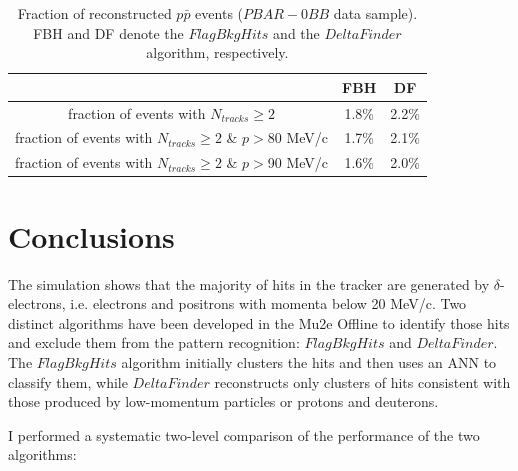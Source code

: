 \begin{center}
        \begin{table}[h!]
        \centering
        \renewcommand{\arraystretch}{1.}
        \begin{tabular}{| c | c | c |} 
            \hline
            &  FBH & DF\\
            \hline
            fraction of events with $N_{tracks} \geq 2$ &  1.8\% & 2.2\%\\
            \hline
            fraction of events with $N_{tracks} \geq 2$ \& $p>$80 MeV/c & 1.7\% & 2.1\%\\
            \hline
            fraction of events with $N_{tracks} \geq 2$ \& $p>$90 MeV/c & 1.6\% & 2.0\%\\
            \hline
            \end{tabular}
        \caption{Fraction of reconstructed $p\bar{p}$ events 
        ($PBAR-0BB$ data sample). FBH and DF denote the $FlagBkgHits$ and the $DeltaFinder$ algorithm, respectively.}
        \label{tab:recoeffpbar}
        \end{table}
\end{center}

\section{Conclusions}
The simulation shows that the majority 
of hits in the tracker are generated by 
$\delta$-electrons, i.e. electrons 
and positrons with momenta below 20 MeV/c. 
Two distinct algorithms have been developed in the Mu2e Offline to 
identify those hits and exclude them from the pattern recognition: 
$FlagBkgHits$ and $DeltaFinder$. 
The $FlagBkgHits$ algorithm initially clusters the hits and then uses an ANN 
to classify them, while $DeltaFinder$ reconstructs only clusters of hits  
consistent with those produced by low-momentum particles or protons and deuterons.

I performed a systematic two-level comparison of the performance of the two algorithms:

